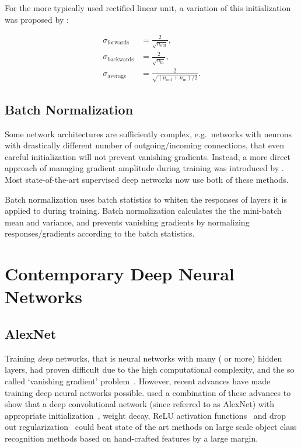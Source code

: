 \documentclass[thesis]{subfiles}
\begin{document}
For the more typically used rectified linear unit, a variation of this initialization was proposed by \citet{He2015b}:

\begin{equation}
\begin{aligned}
	\sigma_{\textrm{forwards}} &= \frac{2}{\sqrt{n_{\text{out}}}},\\
	\sigma_{\textrm{backwards}} &= \frac{2}{\sqrt{n_{\text{in}}}},\\
	\sigma_{\textrm{average}} &= \frac{2}{\sqrt{(n_{\text{out}} + n_{\text{in}})/2}}.
\end{aligned}
\end{equation}

\subsection{Batch Normalization}
Some network architectures are sufficiently complex, e.g.~networks with neurons with drastically different number of outgoing/incoming connections, that even careful initialization will not prevent vanishing gradients. Instead, a more direct approach of managing gradient amplitude during training was introduced by \citet{Ioffe2015}. Most state-of-the-art supervised deep networks now use both of these methods.

Batch normalization uses batch statistics to whiten the responses of layers it is applied to during training. Batch normalization calculates the the mini-batch mean and variance, and prevents vanishing gradients by normalizing responses/gradients according to the batch statistics. 

\section{Contemporary Deep Neural Networks}

\subsection{AlexNet}
Training \emph{deep} networks, that is neural networks with many ( or more) hidden layers, had proven difficult due to the high computational complexity, and the so called `vanishing gradient' problem~\citep{bengio:ieeenn94}. However, recent advances have made training deep neural networks possible. \citet{Krizhevsky2012} used a combination of these advances to show that a deep convolutional network (since referred to as AlexNet) with appropriate initialization~\citep{Sutskever2013momentum}, weight decay, ReLU activation functions~\citep{conf/icml/NairH10} and drop out regularization~\citep{Hinton2012} could beat state of the art methods on large scale object class recognition methods based on hand-crafted features by a large margin. 
\end{document}
